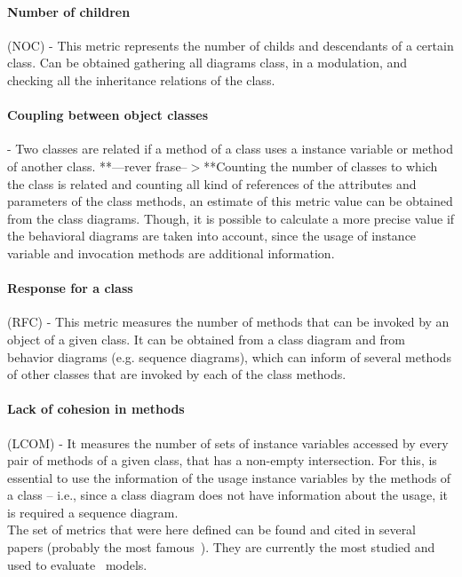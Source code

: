 \paragraph{Number of children} (NOC) - This metric represents the number of childs and descendants of a certain class. Can be obtained gathering all diagrams class, in a \umlS modulation, and checking all the inheritance relations of the class.

\paragraph{Coupling between object classes} - Two classes are related if a method of a class uses a instance variable or method of another class. **---rever frase--$>$**Counting the number of classes to which the class is related and counting all kind of references of the attributes and parameters of the class methods, an estimate of this metric value can be obtained from the class diagrams. Though, it is possible to calculate a more precise value if the behavioral diagrams are taken into account, since the usage of instance variable and invocation methods are additional information.

\paragraph{Response for a class} (RFC) - This metric measures the number of methods that can be invoked by an object of a given class. It can be obtained from a class diagram and from behavior diagrams (e.g. sequence diagrams), which can inform of several methods of other classes that are invoked by each of the class methods.

\paragraph{Lack of cohesion in methods} (LCOM) - It measures the number of sets of instance variables accessed by every pair of methods of a given class, that has a non-empty intersection. For this, is essential to use the information of the usage instance variables by the methods of a class -- i.e., since a class diagram does not have information about the usage, it is required a sequence diagram.\\

The set of metrics that were here defined can be found and cited in several papers (probably the most famous~\cite{Power2}). They are currently the most studied and used to evaluate \uml\ models.

